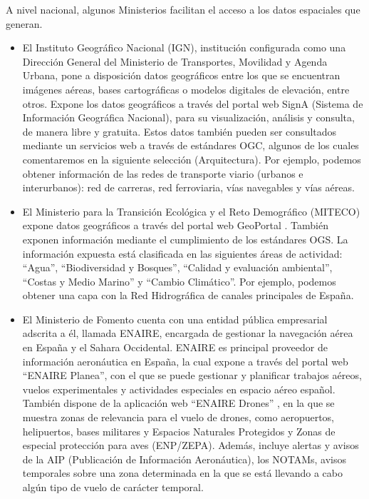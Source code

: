 A nivel nacional, algunos Ministerios facilitan el acceso a los datos espaciales que generan.
\begin{itemize}
  \item El Instituto Geográfico Nacional (IGN), institución configurada como una Dirección General del Ministerio de Transportes, Movilidad y Agenda Urbana,
  pone a disposición datos geográficos entre los que se encuentran imágenes aéreas, bases cartográficas o modelos digitales de elevación, entre otros.
  Expone los datos geográficos a través del portal web SignA \cite{SignA} (Sistema de Información Geográfica Nacional), para su visualización, análisis y consulta, de manera libre y gratuita.
  Estos datos también pueden ser consultados mediante un servicios web a través de estándares OGC, algunos de los cuales comentaremos en la siguiente selección (Arquitectura). 
  Por ejemplo, podemos obtener información de las redes de transporte viario (urbanos e interurbanos): red de carreras, red ferroviaria, vías navegables y vías aéreas.

  \item El Ministerio para la Transición Ecológica y el Reto Demográfico (MITECO) expone datos geográficos a través del portal web GeoPortal \cite{GeoPortal}.  
  También exponen información mediante el cumplimiento de los estándares OGS. La información expuesta está clasificada en las siguientes áreas de actividad: 
  “Agua”, “Biodiversidad y Bosques”, “Calidad y evaluación ambiental”, “Costas y Medio Marino” y “Cambio Climático”. 
  Por ejemplo, podemos obtener una capa con la Red Hidrográfica de canales principales de España.

  \item El Ministerio de Fomento cuenta con una entidad pública empresarial adscrita a él, llamada ENAIRE, encargada de gestionar la navegación aérea en España y el Sahara Occidental.
  ENAIRE es principal proveedor de información aeronáutica en España, la cual expone a través del portal web “ENAIRE Planea”, con el que se puede gestionar y planificar trabajos aéreos, vuelos experimentales y actividades especiales en espacio aéreo español.
  También dispone de la aplicación web “ENAIRE Drones” \cite{ENAIRE-Drones}, en la que se muestra zonas de relevancia para el vuelo de drones, como aeropuertos, helipuertos, bases militares y Espacios Naturales Protegidos y Zonas de especial protección para aves (ENP/ZEPA).
  Además, incluye alertas y avisos de la AIP (Publicación de Información Aeronáutica), los NOTAMs, avisos temporales sobre una zona determinada en la que se está llevando a cabo algún tipo de vuelo de carácter temporal. 
  
\end{itemize}

